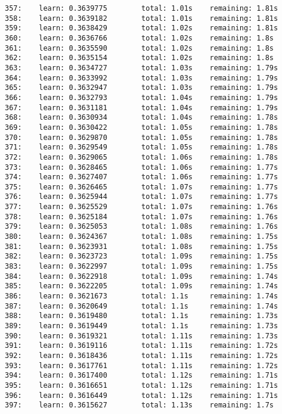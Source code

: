 \documentclass[11pt]{article}
\begin{document}
\begin{Verbatim}[commandchars=\\\{\}]
357:    learn: 0.3639775        total: 1.01s    remaining: 1.81s
358:    learn: 0.3639182        total: 1.01s    remaining: 1.81s
359:    learn: 0.3638429        total: 1.02s    remaining: 1.81s
360:    learn: 0.3636766        total: 1.02s    remaining: 1.8s
361:    learn: 0.3635590        total: 1.02s    remaining: 1.8s
362:    learn: 0.3635154        total: 1.02s    remaining: 1.8s
363:    learn: 0.3634727        total: 1.03s    remaining: 1.79s
364:    learn: 0.3633992        total: 1.03s    remaining: 1.79s
365:    learn: 0.3632947        total: 1.03s    remaining: 1.79s
366:    learn: 0.3632793        total: 1.04s    remaining: 1.79s
367:    learn: 0.3631181        total: 1.04s    remaining: 1.79s
368:    learn: 0.3630934        total: 1.04s    remaining: 1.78s
369:    learn: 0.3630422        total: 1.05s    remaining: 1.78s
370:    learn: 0.3629870        total: 1.05s    remaining: 1.78s
371:    learn: 0.3629549        total: 1.05s    remaining: 1.78s
372:    learn: 0.3629065        total: 1.06s    remaining: 1.78s
373:    learn: 0.3628465        total: 1.06s    remaining: 1.77s
374:    learn: 0.3627407        total: 1.06s    remaining: 1.77s
375:    learn: 0.3626465        total: 1.07s    remaining: 1.77s
376:    learn: 0.3625944        total: 1.07s    remaining: 1.77s
377:    learn: 0.3625529        total: 1.07s    remaining: 1.76s
378:    learn: 0.3625184        total: 1.07s    remaining: 1.76s
379:    learn: 0.3625053        total: 1.08s    remaining: 1.76s
380:    learn: 0.3624367        total: 1.08s    remaining: 1.75s
381:    learn: 0.3623931        total: 1.08s    remaining: 1.75s
382:    learn: 0.3623723        total: 1.09s    remaining: 1.75s
383:    learn: 0.3622997        total: 1.09s    remaining: 1.75s
384:    learn: 0.3622918        total: 1.09s    remaining: 1.74s
385:    learn: 0.3622205        total: 1.09s    remaining: 1.74s
386:    learn: 0.3621673        total: 1.1s     remaining: 1.74s
387:    learn: 0.3620649        total: 1.1s     remaining: 1.74s
388:    learn: 0.3619480        total: 1.1s     remaining: 1.73s
389:    learn: 0.3619449        total: 1.1s     remaining: 1.73s
390:    learn: 0.3619321        total: 1.11s    remaining: 1.73s
391:    learn: 0.3619116        total: 1.11s    remaining: 1.72s
392:    learn: 0.3618436        total: 1.11s    remaining: 1.72s
393:    learn: 0.3617761        total: 1.11s    remaining: 1.72s
394:    learn: 0.3617400        total: 1.12s    remaining: 1.71s
395:    learn: 0.3616651        total: 1.12s    remaining: 1.71s
396:    learn: 0.3616449        total: 1.12s    remaining: 1.71s
397:    learn: 0.3615627        total: 1.13s    remaining: 1.7s

\end{Verbatim}
\end{document}

